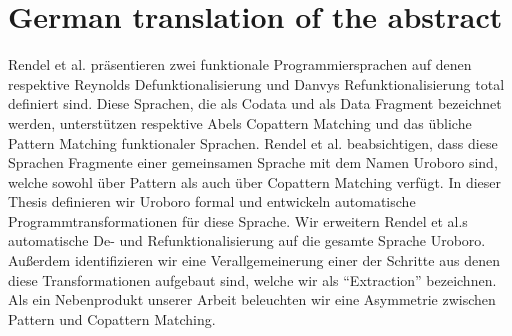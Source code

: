 \chapter{German translation of the abstract}

Rendel et al. präsentieren zwei funktionale Programmiersprachen auf denen respektive Reynolds Defunktionalisierung und Danvys Refunktionalisierung total definiert sind. Diese Sprachen, die als Codata und als Data Fragment bezeichnet werden, unterstützen respektive Abels Copattern Matching und das übliche Pattern Matching funktionaler Sprachen. Rendel et al. beabsichtigen, dass diese Sprachen Fragmente einer gemeinsamen Sprache mit dem Namen Uroboro sind, welche sowohl über Pattern als auch über Copattern Matching verfügt. In dieser Thesis definieren wir Uroboro formal und entwickeln automatische Programmtransformationen für diese Sprache. Wir erweitern Rendel et al.s automatische De- und Refunktionalisierung auf die gesamte Sprache Uroboro. Außerdem identifizieren wir eine Verallgemeinerung einer der Schritte aus denen diese Transformationen aufgebaut sind, welche wir als ``Extraction'' bezeichnen. Als ein Nebenprodukt unserer Arbeit beleuchten wir eine Asymmetrie zwischen Pattern und Copattern Matching.
